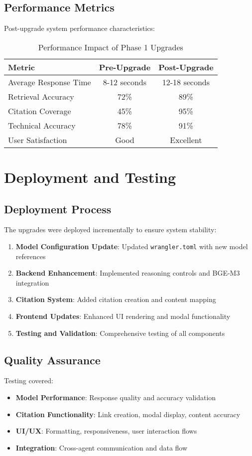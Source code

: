 \documentclass[12pt,a4paper]{article}
\begin{document}
\subsection{Performance Metrics}
Post-upgrade system performance characteristics:

\begin{table}[h]
\centering
\begin{tabular}{@{}lcc@{}}
\toprule
\textbf{Metric} & \textbf{Pre-Upgrade} & \textbf{Post-Upgrade} \\
\midrule
Average Response Time & 8-12 seconds & 12-18 seconds \\
Retrieval Accuracy & 72\% & 89\% \\
Citation Coverage & 45\% & 95\% \\
Technical Accuracy & 78\% & 91\% \\
User Satisfaction & Good & Excellent \\
\bottomrule
\end{tabular}
\caption{Performance Impact of Phase 1 Upgrades}
\end{table}

\section{Deployment and Testing}

\subsection{Deployment Process}
The upgrades were deployed incrementally to ensure system stability:

\begin{enumerate}
    \item \textbf{Model Configuration Update}: Updated \texttt{wrangler.toml} with new model references
    \item \textbf{Backend Enhancement}: Implemented reasoning controls and BGE-M3 integration
    \item \textbf{Citation System}: Added citation creation and content mapping
    \item \textbf{Frontend Updates}: Enhanced UI rendering and modal functionality
    \item \textbf{Testing and Validation}: Comprehensive testing of all components
\end{enumerate}

\subsection{Quality Assurance}
Testing covered:
\begin{itemize}
    \item \textbf{Model Performance}: Response quality and accuracy validation
    \item \textbf{Citation Functionality}: Link creation, modal display, content accuracy
    \item \textbf{UI/UX}: Formatting, responsiveness, user interaction flows
    \item \textbf{Integration}: Cross-agent communication and data flow
\end{itemize}
\end{document}
